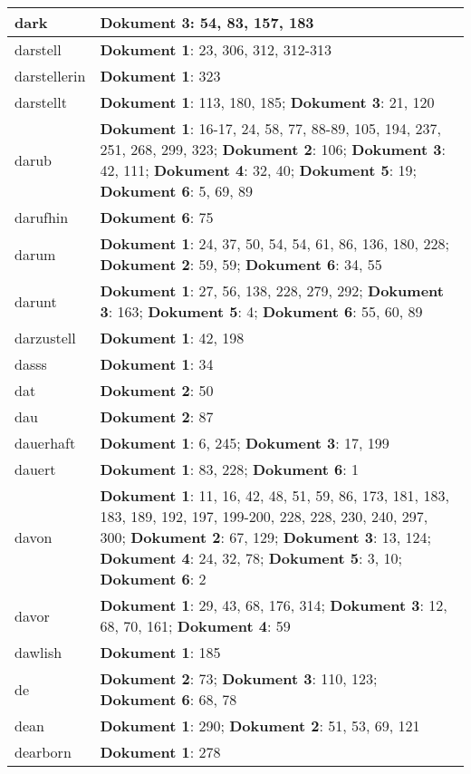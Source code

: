 \documentclass[a5paper]{article}
\begin{document}
\begin{longtable}[l]{|l|p{3in}|}
\hline
dark & \textbf{Dokument 3}: 54, 83, 157, 183 \\
\hline
darstell & \textbf{Dokument 1}: 23, 306, 312, 312-313 \\
\hline
darstellerin & \textbf{Dokument 1}: 323 \\
\hline
darstellt & \textbf{Dokument 1}: 113, 180, 185; \textbf{Dokument 3}: 21, 120 \\
\hline
darub & \textbf{Dokument 1}: 16-17, 24, 58, 77, 88-89, 105, 194, 237, 251, 268, 299, 323; \textbf{Dokument 2}: 106; \textbf{Dokument 3}: 42, 111; \textbf{Dokument 4}: 32, 40; \textbf{Dokument 5}: 19; \textbf{Dokument 6}: 5, 69, 89 \\
\hline
darufhin & \textbf{Dokument 6}: 75 \\
\hline
darum & \textbf{Dokument 1}: 24, 37, 50, 54, 54, 61, 86, 136, 180, 228; \textbf{Dokument 2}: 59, 59; \textbf{Dokument 6}: 34, 55 \\
\hline
darunt & \textbf{Dokument 1}: 27, 56, 138, 228, 279, 292; \textbf{Dokument 3}: 163; \textbf{Dokument 5}: 4; \textbf{Dokument 6}: 55, 60, 89 \\
\hline
darzustell & \textbf{Dokument 1}: 42, 198 \\
\hline
dasss & \textbf{Dokument 1}: 34 \\
\hline
dat & \textbf{Dokument 2}: 50 \\
\hline
dau & \textbf{Dokument 2}: 87 \\
\hline
dauerhaft & \textbf{Dokument 1}: 6, 245; \textbf{Dokument 3}: 17, 199 \\
\hline
dauert & \textbf{Dokument 1}: 83, 228; \textbf{Dokument 6}: 1 \\
\hline
davon & \textbf{Dokument 1}: 11, 16, 42, 48, 51, 59, 86, 173, 181, 183, 183, 189, 192, 197, 199-200, 228, 228, 230, 240, 297, 300; \textbf{Dokument 2}: 67, 129; \textbf{Dokument 3}: 13, 124; \textbf{Dokument 4}: 24, 32, 78; \textbf{Dokument 5}: 3, 10; \textbf{Dokument 6}: 2 \\
\hline
davor & \textbf{Dokument 1}: 29, 43, 68, 176, 314; \textbf{Dokument 3}: 12, 68, 70, 161; \textbf{Dokument 4}: 59 \\
\hline
dawlish & \textbf{Dokument 1}: 185 \\
\hline
de & \textbf{Dokument 2}: 73; \textbf{Dokument 3}: 110, 123; \textbf{Dokument 6}: 68, 78 \\
\hline
dean & \textbf{Dokument 1}: 290; \textbf{Dokument 2}: 51, 53, 69, 121 \\
\hline
dearborn & \textbf{Dokument 1}: 278 \\

\end{longtable}
\end{document}
